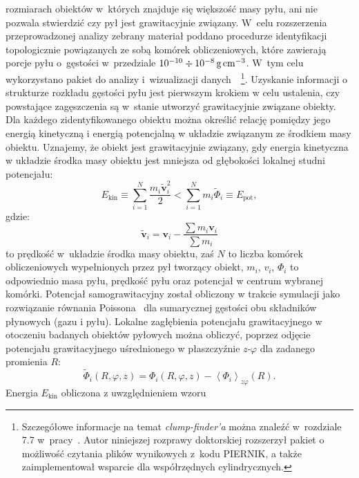 rozmiarach obiektów w~których znajduje się większość masy pyłu, ani nie pozwala
stwierdzić czy pył jest grawitacyjnie związany. W~celu rozszerzenia
przeprowadzonej analizy zebrany materiał poddano procedurze identyfikacji
topologicznie powiązanych ze sobą komórek obliczeniowych, które zawierają porcje
pyłu o~gęstości w~przedziale $10^{-10}\div10^{-8}\hbox{$\thinspace\textrm{g}$}\hbox{$\thinspace\textrm{cm}$}^{-3}$. W~tym celu
wykorzystano pakiet do analizy i~wizualizacji danych~\yt{}~\footnote{Szczegółowe
informacje na temat \emph{clump-finder'a} można znaleźć w~rozdziale 7.7
w~pracy~\cite{yt}. Autor niniejszej rozprawy doktorskiej rozszerzył pakiet
\yt{} o możliwość czytania plików wynikowych z~kodu \textsc{PIERNIK}, a także
zaimplementował wsparcie dla współrzędnych cylindrycznych.}.  Uzyskanie
informacji o strukturze rozkładu gęstości pyłu jest pierwszym krokiem w celu
ustalenia, czy powstające zagęszczenia są w~stanie utworzyć grawitacyjnie
związane obiekty. Dla każdego zidentyfikowanego obiektu można określić relację
pomiędzy jego energią kinetyczną i energią potencjalną w układzie związanym ze
środkiem masy obiektu. Uznajemy, że obiekt jest grawitacyjnie związany, gdy
energia kinetyczna w układzie środka masy obiektu jest mniejsza od głębokości
lokalnej studni potencjału:
%
\begin{equation}
   \label{eq:bcrit}
   E_{\textrm{kin}} \equiv \sum\limits_{i=1}^N \frac{m_i\tilde{\mathbf{v}}_i^2}{2} 
   < \sum\limits_{i=1}^N m_i\tilde{\Phi}_i \equiv E_{\textrm{pot}},
\end{equation}
%
gdzie:
\begin{equation}
   \tilde{\mathbf{v}}_i = \mathbf{v}_i - \frac{\sum m_i \mathbf{v}_i}{\sum m_i}
   \label{eq:velcom}
\end{equation}
to prędkość w~układzie środka masy obiektu, zaś $N$ to liczba komórek
obliczeniowych wypełnionych przez pył tworzący obiekt, $m_i$, $v_i$, $\Phi_i$ to
odpowiednio masa pyłu, prędkość pyłu oraz potencjał w centrum wybranej komórki. Potencjał
samograwitacyjny został obliczony w trakcie symulacji jako rozwiązanie
równania Poissona~ dla sumarycznej gęstości obu składników
płynowych (gazu i pyłu).  Lokalne zagłębienia potencjału grawitacyjnego w
otoczeniu badanych obiektów pyłowych można obliczyć, poprzez odjęcie potencjału
grawitacyjnego uśrednionego w płaszczyźnie \emph{z-$\varphi$} dla zadanego
promienia $R$:
%
\begin{equation}
   \tilde{\Phi}_i(R,\varphi,z) = \Phi_i(R,\varphi,z) -
   \left<\Phi_i\right>_{z\varphi}(R).
\end{equation}
%
Energia $E_{\textrm{kin}}$ obliczona z uwzględnieniem wzoru~
